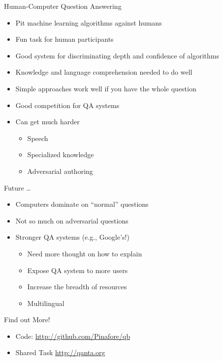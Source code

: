 \documentclass[xcolor=dvipsnames]{beamer}
\begin{document}
\begin{frame}{Human-Computer Question Answering}

  \begin{itemize}
    \item Pit machine learning algorithms against humans
    \item Fun task for human participants
    \item Good system for discriminating depth and confidence of
      algorithms
    \item Knowledge and language comprehension needed to do well
    \item Simple approaches work well if you have the whole question
    \item Good competition for QA systems
    \item Can get much harder
      \begin{itemize}
        \item Speech
       \item Specialized knowledge
        \item Adversarial authoring
      \end{itemize}
  \end{itemize}

\end{frame}


\begin{frame}{Future \dots}

  \begin{itemize}
    \item Computers dominate on ``normal'' questions
    \item Not so much on adversarial questions
    \item Stronger QA systems (e.g., Google's!)
      \begin{itemize}
        \item Need more thought on how to explain
        \item Expose QA system to more users
        \item Increase the breadth of resources
        \item Multilingual
      \end{itemize}
  \end{itemize}

\end{frame}





\begin{frame}{Find out More!}

		\begin{itemize}
			\item Code: \url{http://github.com/Pinafore/qb}
                        \item Shared Task \url{http://qanta.org}
		\end{itemize}

\end{frame}
\end{document}
